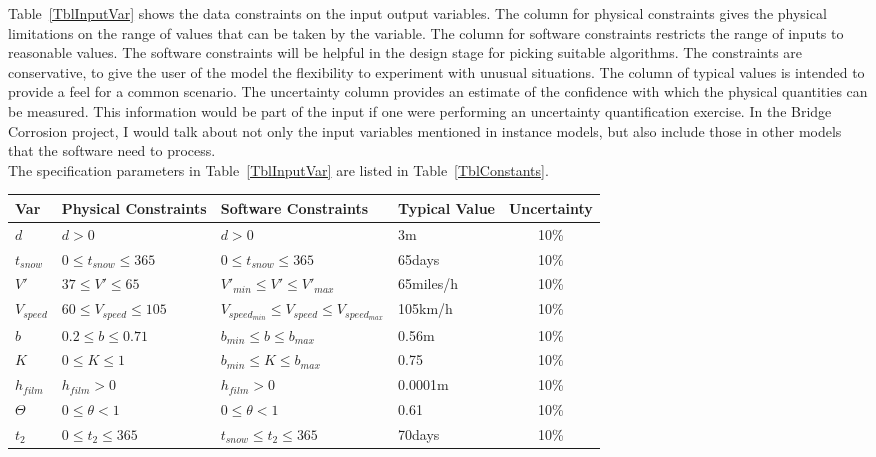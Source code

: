 \documentclass[12pt]{article}
\begin{document}
Table~\ref{TblInputVar} shows the data constraints on the input output
variables.  The column for physical constraints gives the physical limitations
on the range of values that can be taken by the variable.  The column for
software constraints restricts the range of inputs to reasonable values.  The
software constraints will be helpful in the design stage for picking suitable
algorithms.  The constraints are conservative, to give the user of the model the
flexibility to experiment with unusual situations.  The column of typical values
is intended to provide a feel for a common scenario.  The uncertainty column
provides an estimate of the confidence with which the physical quantities can be
measured.  This information would be part of the input if one were performing an
uncertainty quantification exercise. In the Bridge Corrosion project, I would talk about not only the input variables mentioned in instance models, but also include those in other models that the software need to process.\\
The specification parameters in Table~\ref{TblInputVar} are listed in
Table~\ref{TblConstants}.

\begin{table}[!h]
  \caption{Input Variables} \label{TblInputVar}
  \renewcommand{\arraystretch}{1.2}
\noindent \begin{longtable*}{l l l l c} 
  \toprule
  \textbf{Var} & \textbf{Physical Constraints} & \textbf{Software Constraints} &
                             \textbf{Typical Value} & \textbf{Uncertainty}\\
  \midrule 
  $d$ & $d > 0$ & $d>0$ & 3m & 10\%
  \\
  $t_{snow}$ & $0 \leq t_{snow} \leq 365$ & $0 \leq t_{snow} \leq 365$ & 65days & 10\%
  \\
  $V'$ & $37 \leq V' \leq 65$ & $V'_{min}\leq V' \leq V'_{max}$ & 65miles/h & 10\%
  \\
  $V_{speed}$ & $60 \leq V_{speed} \leq 105$ & $V_{speed_{min}} \leq V_{speed} \leq V_{speed_{max}}$ & 105km/h & 10\%
  \\
  $b$ & $0.2 \leq b \leq 0.71$ & $b_{min} \leq b \leq b_{max}$ & 0.56m & 10\%
  \\
  $K$ & $0 \leq K \leq 1$ & $b_{min} \leq K \leq b_{max}$ & 0.75 & 10\%
  \\
  $h_{film}$ & $h_{film} > 0$ & $h_{film} > 0$ & 0.0001m & 10\%
  \\
  $\Theta$ & $0 \leq \theta < 1$ & $0 \leq \theta < 1$ & 0.61 & 10\%
  \\
  $t_2$ & $0 \leq t_2 \leq 365$ & $t_{snow} \leq t_2 \leq 365$ & 70days & 10\%
  \\
  \bottomrule
\end{longtable*}
\end{table}
\end{document}

